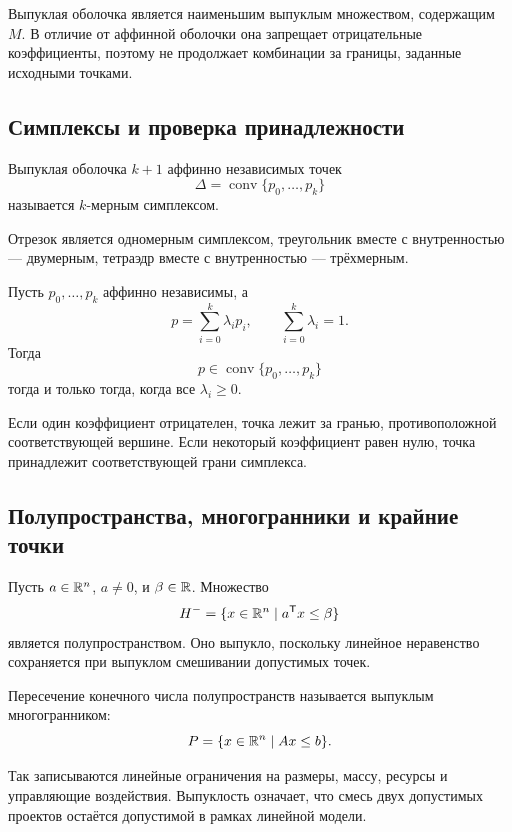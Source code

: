 Выпуклая оболочка является наименьшим выпуклым множеством, содержащим \(M\). В отличие от аффинной оболочки она запрещает отрицательные коэффициенты, поэтому не продолжает комбинации за границы, заданные исходными точками.

\subsection{Симплексы и проверка принадлежности}

\begin{definition}
Выпуклая оболочка \(k+1\) аффинно независимых точек
\[
\Delta=\operatorname{conv}\{p_0,\dots,p_k\}
\]
называется \(k\)-мерным симплексом.
\end{definition}

Отрезок является одномерным симплексом, треугольник вместе с внутренностью --- двумерным, тетраэдр вместе с внутренностью --- трёхмерным.

\begin{criterion}
Пусть \(p_0,\dots,p_k\) аффинно независимы, а
\[
p=\sum_{i=0}^{k}\lambda_ip_i,
\qquad
\sum_{i=0}^{k}\lambda_i=1.
\]
Тогда
\[
p\in\operatorname{conv}\{p_0,\dots,p_k\}
\]
тогда и только тогда, когда все \(\lambda_i\geq0\).
\end{criterion}

Если один коэффициент отрицателен, точка лежит за гранью, противоположной соответствующей вершине. Если некоторый коэффициент равен нулю, точка принадлежит соответствующей грани симплекса.

\subsection{Полупространства, многогранники и крайние точки}

Пусть \(a\in\mathbb{R}^n\), \(a\neq0\), и \(\beta\in\mathbb{R}\). Множество
\[
H^-=\{x\in\mathbb{R}^n\mid a^{\mathsf{T}}x\leq\beta\}
\]
является полупространством. Оно выпукло, поскольку линейное неравенство сохраняется при выпуклом смешивании допустимых точек.

\begin{definition}
Пересечение конечного числа полупространств называется выпуклым многогранником:
\[
P=\{x\in\mathbb{R}^n\mid Ax\leq b\}.
\]
\end{definition}

Так записываются линейные ограничения на размеры, массу, ресурсы и управляющие воздействия. Выпуклость означает, что смесь двух допустимых проектов остаётся допустимой в рамках линейной модели.

